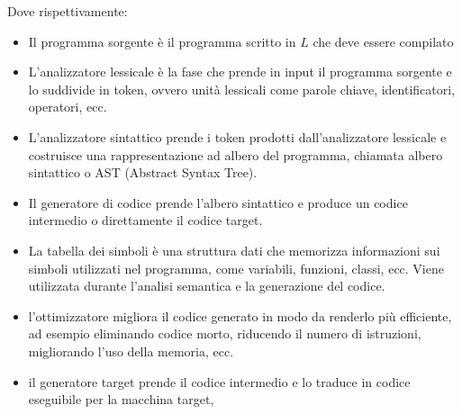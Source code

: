 \documentclass[a4paper]{article}
\begin{document}
\begin{figure}[H]
    \centering
\end{figure}
\noindent
Dove rispettivamente:
\begin{itemize}
    \item Il programma sorgente è il programma scritto in $L$ che deve essere compilato
    \item L'analizzatore lessicale è la fase che prende in input il programma sorgente 
    e lo suddivide in token, ovvero unità lessicali come parole chiave, identificatori, operatori, ecc.
    \item L'analizzatore sintattico prende i token prodotti dall'analizzatore lessicale e costruisce una
     rappresentazione ad albero del programma, chiamata albero sintattico o AST (Abstract Syntax Tree).
    \item Il generatore di codice prende l'albero sintattico e
     produce un codice intermedio o direttamente il codice target.
    \item La tabella dei simboli è una struttura dati che memorizza informazioni sui simboli utilizzati nel programma,
come variabili, funzioni, classi, ecc. Viene utilizzata durante l'analisi semantica e la generazione del codice.
    \item l'ottimizzatore migliora il codice generato in modo da renderlo più efficiente, ad esempio eliminando codice morto,
riducendo il numero di istruzioni, migliorando l'uso della memoria, ecc.
    \item il generatore target prende il codice intermedio e lo traduce in codice eseguibile per la macchina target,
\end{itemize}
\end{document}
